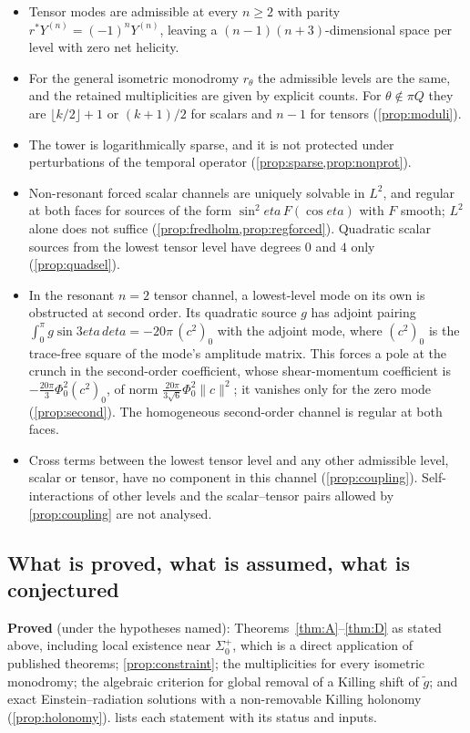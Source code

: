 \documentclass[11pt]{article}
\theoremstyle{canonmath}
\theoremstyle{canonpostulate}
\theoremstyle{canonproposition}
\theoremstyle{canonmath}
\theoremstyle{canonproposition}
\def\mathbb#1{#1}%
\def\eta{eta}%
\begin{document}
\begin{enumerate}[label=\textbf{\Alph*.}]
\begin{itemize}
  \item Tensor modes are admissible at every $n \ge 2$ with parity $r^*Y^{(n)} = (-1)^n Y^{(n)}$, leaving a $(n-1)(n+3)$-dimensional space per level with zero net helicity.
  \item For the general isometric monodromy $r_\theta$ the admissible levels are the same, and the retained multiplicities are given by explicit counts. For $\theta\notin\pi\mathbb{Q}$ they are $\lfloor k/2\rfloor+1$ or $(k+1)/2$ for scalars and $n-1$ for tensors (\cref{prop:moduli}).
  \item The tower is logarithmically sparse, and it is not protected under perturbations of the temporal operator (\cref{prop:sparse,prop:nonprot}).
  \item Non-resonant forced scalar channels are uniquely solvable in $L^2$, and regular at both faces for sources of the form $\sin^2\eta\,F(\cos\eta)$ with $F$ smooth; $L^2$ alone does not suffice (\cref{prop:fredholm,prop:regforced}). Quadratic scalar sources from the lowest tensor level have degrees $0$ and $4$ only (\cref{prop:quadsel}).
  \item In the resonant $n=2$ tensor channel, a lowest-level mode on its own is obstructed at second order. Its quadratic source $g$ has adjoint pairing $\int_0^\pi g\sin3\eta\,d\eta = -20\pi\,(c^2)_0$ with the adjoint mode, where $(c^2)_0$ is the trace-free square of the mode's amplitude matrix. This forces a pole at the crunch in the second-order coefficient, whose shear-momentum coefficient is $-\tfrac{20\pi}{3}\Phi_0^2(c^2)_0$, of norm $\tfrac{20\pi}{3\sqrt6}\Phi_0^2\|c\|^2$; it vanishes only for the zero mode (\cref{prop:second}). The homogeneous second-order channel is regular at both faces.
  \item Cross terms between the lowest tensor level and any other admissible level, scalar or tensor, have no component in this channel (\cref{prop:coupling}). Self-interactions of other levels and the scalar--tensor pairs allowed by \cref{prop:coupling} are not analysed.
  \end{itemize}
\end{enumerate}

\subsection*{What is proved, what is assumed, what is conjectured}

\textbf{Proved} (under the hypotheses named): Theorems~\ref{thm:A}--\ref{thm:D} as stated above, including local existence near $\Sigma_0^+$, which is a direct application of published theorems; \cref{prop:constraint}; the multiplicities for every isometric monodromy; the algebraic criterion for global removal of a Killing shift of $\tilde g$; and exact Einstein--radiation solutions with a non-removable Killing holonomy (\cref{prop:holonomy}).  lists each statement with its status and inputs.
\end{document}
